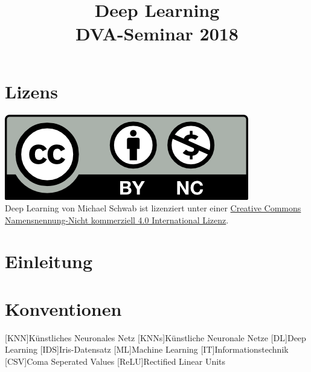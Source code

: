 \documentclass[conference, german]{IEEEtran}
\begin{document}
\title{Deep Learning\\
{\footnotesize DVA-Seminar 2018}
}
\author{
}

\maketitle
\renewcommand{\abstractname}{Zusammenfassung}



\begin{abstract}
\end{abstract}

\section*{Lizens}
\href{http://creativecommons.org/licenses/by-nc/4.0/}{\includegraphics{img/by-nc.png}}\\
{Deep Learning} von {Michael Schwab} ist lizenziert unter einer
\href{http://creativecommons.org/licenses/by-nc/4.0/}{Creative Commons
	Namensnennung-Nicht kommerziell 4.0 International Lizenz}.
\section{Einleitung} 
\section{Konventionen}
\begin{acronym}
	[KNN]{Künstliches Neuronales Netz}
	[KNNs]{Künstliche Neuronale Netze}
	[DL]{Deep Learning}
	[IDS]{Iris-Datensatz}
	[ML]{Machine Learning}
	[IT]{Informationstechnik}
	[CSV]{Coma Seperated Values}
	[ReLU]{Rectified Linear Units}
\end{acronym}
\end{document}
